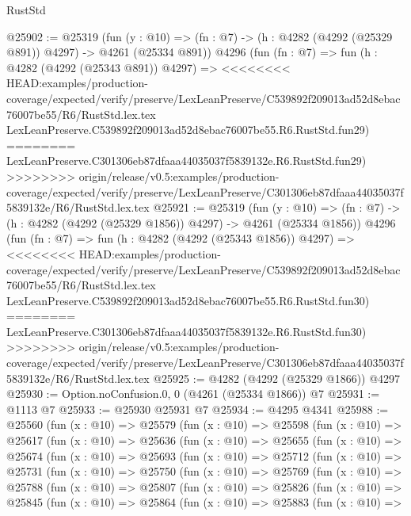 \begin{lexlean}{RustStd}
\begin{coremodule}
{\begin{coremodule}
{{{{{{{{{{{{{{{{{{{{{{{{{{{{{{{{{{{@25902 := @25319
    (fun (y : @10) => (fn : @7) -> (h : @4282 (@4292 (@25329 @891)) @4297) -> @4261 (@25334 @891))
    @4296
    (fun (fn : @7) =>
    fun (h : @4282 (@4292 (@25343 @891)) @4297) =>
<<<<<<<< HEAD:examples/production-coverage/expected/verify/preserve/LexLeanPreserve/C539892f209013ad52d8ebac76007be55/R6/RustStd.lex.tex
    LexLeanPreserve.C539892f209013ad52d8ebac76007be55.R6.RustStd.fun29)
========
    LexLeanPreserve.C301306eb87dfaaa44035037f5839132e.R6.RustStd.fun29)
>>>>>>>> origin/release/v0.5:examples/production-coverage/expected/verify/preserve/LexLeanPreserve/C301306eb87dfaaa44035037f5839132e/R6/RustStd.lex.tex
@25921 := @25319
    (fun (y : @10) => (fn : @7) -> (h : @4282 (@4292 (@25329 @1856)) @4297) -> @4261 (@25334 @1856))
    @4296
    (fun (fn : @7) =>
    fun (h : @4282 (@4292 (@25343 @1856)) @4297) =>
<<<<<<<< HEAD:examples/production-coverage/expected/verify/preserve/LexLeanPreserve/C539892f209013ad52d8ebac76007be55/R6/RustStd.lex.tex
    LexLeanPreserve.C539892f209013ad52d8ebac76007be55.R6.RustStd.fun30)
========
    LexLeanPreserve.C301306eb87dfaaa44035037f5839132e.R6.RustStd.fun30)
>>>>>>>> origin/release/v0.5:examples/production-coverage/expected/verify/preserve/LexLeanPreserve/C301306eb87dfaaa44035037f5839132e/R6/RustStd.lex.tex
@25925 := @4282 (@4292 (@25329 @1866)) @4297
@25930 := Option.noConfusion.{0, 0} (@4261 (@25334 @1866)) @7
@25931 := @1113 @7
@25933 := @25930 @25931 @7
@25934 := @4295 @4341
@25988 := @25560
    (fun (x : @10) =>
    @25579
      (fun (x : @10) =>
      @25598
        (fun (x : @10) =>
        @25617
          (fun (x : @10) =>
          @25636
            (fun (x : @10) =>
            @25655
              (fun (x : @10) =>
              @25674
                (fun (x : @10) =>
                @25693
                  (fun (x : @10) =>
                  @25712
                    (fun (x : @10) =>
                    @25731
                      (fun (x : @10) =>
                      @25750
                        (fun (x : @10) =>
                        @25769
                          (fun (x : @10) =>
                          @25788
                            (fun (x : @10) =>
                            @25807
                              (fun (x : @10) =>
                              @25826
                                (fun (x : @10) =>
                                @25845
                                  (fun (x : @10) =>
                                  @25864
                                    (fun (x : @10) =>
                                    @25883
                                      (fun (x : @10) =>
}}}}}}}}}}}}}}}}}}}}}}}}}}}}}}}}}}}
\end{coremodule}}
\end{coremodule}
\end{lexlean}

